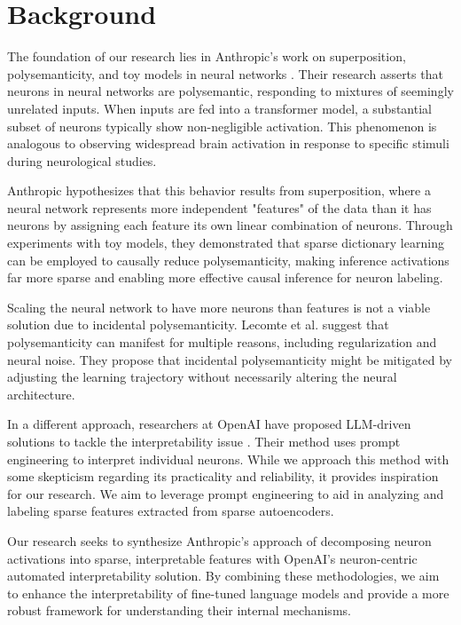 \section{Background}

The foundation of our research lies in Anthropic's work on superposition, polysemanticity, and toy models in neural networks \cite{bricken2023monosemanticity, templeton2024scaling, elhage2021mathematical, elhage2022superposition}. Their research asserts that neurons in neural networks are polysemantic, responding to mixtures of seemingly unrelated inputs. When inputs are fed into a transformer model, a substantial subset of neurons typically show non-negligible activation. This phenomenon is analogous to observing widespread brain activation in response to specific stimuli during neurological studies.

Anthropic hypothesizes that this behavior results from superposition, where a neural network represents more independent "features" of the data than it has neurons by assigning each feature its own linear combination of neurons. Through experiments with toy models, they demonstrated that sparse dictionary learning can be employed to causally reduce polysemanticity, making inference activations far more sparse and enabling more effective causal inference for neuron labeling.

Scaling the neural network to have more neurons than features is not a viable solution due to incidental polysemanticity. Lecomte et al. \cite{lecomte2024causespolysemanticityalternativeorigin} suggest that polysemanticity can manifest for multiple reasons, including regularization and neural noise. They propose that incidental polysemanticity might be mitigated by adjusting the learning trajectory without necessarily altering the neural architecture.

In a different approach, researchers at OpenAI have proposed LLM-driven solutions to tackle the interpretability issue \cite{bills2023language}. Their method uses prompt engineering to interpret individual neurons. While we approach this method with some skepticism regarding its practicality and reliability, it provides inspiration for our research. We aim to leverage prompt engineering to aid in analyzing and labeling sparse features extracted from sparse autoencoders.

Our research seeks to synthesize Anthropic's approach of decomposing neuron activations into sparse, interpretable features with OpenAI's neuron-centric automated interpretability solution. By combining these methodologies, we aim to enhance the interpretability of fine-tuned language models and provide a more robust framework for understanding their internal mechanisms.